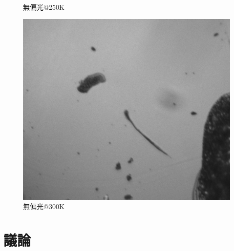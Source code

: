 \documentclass[11pt,a4paper]{jsarticle}
\begin{document}
\begin{figure}[p]
\begin{minipage}{0.333\hsize}
\begin{center}
  \end{center}
  \caption{無偏光@250K}
  \label{fig:nonpol250_2}
 \end{minipage}
 \begin{minipage}{0.333\hsize}
  \begin{center}
   \includegraphics[width=\hsize]{nonpol300_2.eps}
  \end{center}
  \caption{無偏光@300K}
  \label{fig:nonpol300_2}
 \end{minipage}
\end{figure}



\section{議論}
\end{document}
